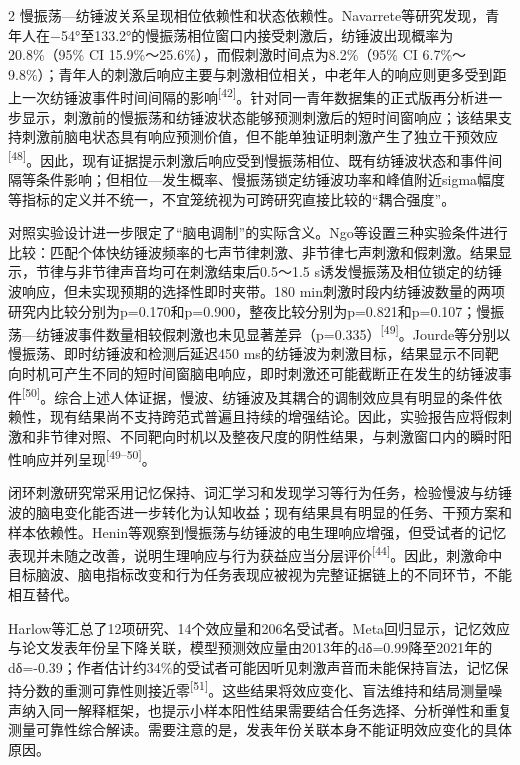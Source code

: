 \documentclass[UTF8,zihao=5,fontset=none]{ctexart}
\newcommand{\hei}{\CJKfamily{hei}}
\newcommand{\leveltwo}[1]{%
  \par\noindent{\hei\fontsize{10.5pt}{15.6pt}\selectfont\bfseries #1\par}}
\newcommand{\refcite}[1]{\nolinebreak[4]\textsuperscript{[#1]}}
\begin{document}
\begin{multicols}{2}
慢振荡—纺锤波关系呈现相位依赖性和状态依赖性。Navarrete等研究发现，青年人在−54°至133.2°的慢振荡相位窗口内接受刺激后，纺锤波出现概率为20.8\%（95\% CI 15.9\%～25.6\%），而假刺激时间点为8.2\%（95\% CI 6.7\%～9.8\%）；青年人的刺激后响应主要与刺激相位相关，中老年人的响应则更多受到距上一次纺锤波事件时间间隔的影响\refcite{42}。针对同一青年数据集的正式版再分析进一步显示，刺激前的慢振荡和纺锤波状态能够预测刺激后的短时间窗响应；该结果支持刺激前脑电状态具有响应预测价值，但不能单独证明刺激产生了独立干预效应\refcite{48}。因此，现有证据提示刺激后响应受到慢振荡相位、既有纺锤波状态和事件间隔等条件影响；但相位—发生概率、慢振荡锁定纺锤波功率和峰值附近sigma幅度等指标的定义并不统一，不宜笼统视为可跨研究直接比较的“耦合强度”。\par

对照实验设计进一步限定了“脑电调制”的实际含义。Ngo等设置三种实验条件进行比较：匹配个体快纺锤波频率的七声节律刺激、非节律七声刺激和假刺激。结果显示，节律与非节律声音均可在刺激结束后0.5～1.5 s诱发慢振荡及相位锁定的纺锤波响应，但未实现预期的选择性即时夹带。180 min刺激时段内纺锤波数量的两项研究内比较分别为p=0.170和p=0.900，整夜比较分别为p=0.821和p=0.107；慢振荡—纺锤波事件数量相较假刺激也未见显著差异（p=0.335）\refcite{49}。Jourde等分别以慢振荡、即时纺锤波和检测后延迟450 ms的纺锤波为刺激目标，结果显示不同靶向时机可产生不同的短时间窗脑电响应，即时刺激还可能截断正在发生的纺锤波事件\refcite{50}。综合上述人体证据，慢波、纺锤波及其耦合的调制效应具有明显的条件依赖性，现有结果尚不支持跨范式普遍且持续的增强结论。因此，实验报告应将假刺激和非节律对照、不同靶向时机以及整夜尺度的阴性结果，与刺激窗口内的瞬时阳性响应并列呈现\refcite{49--50}。\par

\leveltwo{3.3 记忆巩固与认知收益的疗效证据及争议}

闭环刺激研究常采用记忆保持、词汇学习和发现学习等行为任务，检验慢波与纺锤波的脑电变化能否进一步转化为认知收益；现有结果具有明显的任务、干预方案和样本依赖性。Henin等观察到慢振荡与纺锤波的电生理响应增强，但受试者的记忆表现并未随之改善，说明生理响应与行为获益应当分层评价\refcite{44}。因此，刺激命中目标脑波、脑电指标改变和行为任务表现应被视为完整证据链上的不同环节，不能相互替代。\par

Harlow等汇总了12项研究、14个效应量和206名受试者。Meta回归显示，记忆效应与论文发表年份呈下降关联，模型预测效应量由2013年的dδ=0.99降至2021年的dδ=-0.39；作者估计约34\%的受试者可能因听见刺激声音而未能保持盲法，记忆保持分数的重测可靠性则接近零\refcite{51}。这些结果将效应变化、盲法维持和结局测量噪声纳入同一解释框架，也提示小样本阳性结果需要结合任务选择、分析弹性和重复测量可靠性综合解读。需要注意的是，发表年份关联本身不能证明效应变化的具体原因。\par


\end{multicols}
\end{document}
